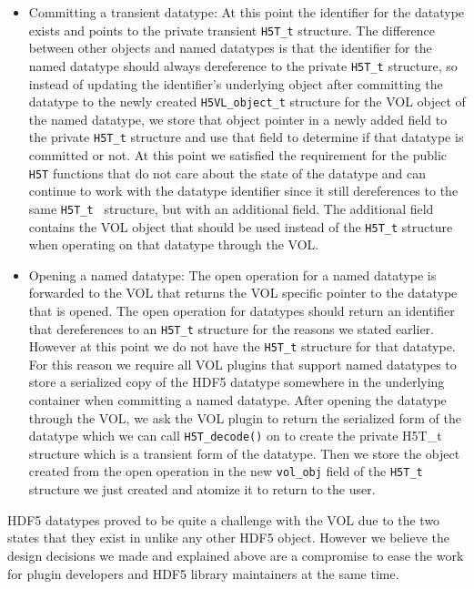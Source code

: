 \begin{itemize}
\item Committing a transient datatype: At this point the identifier for the datatype exists and points to the private transient {\tt H5T\_t} structure. The difference between other objects and named datatypes is that the identifier for the named datatype should always dereference to the private {\tt H5T\_t} structure, so instead of updating the identifier's underlying object after committing the datatype to the newly created {\tt H5VL\_object\_t} structure for the VOL object of the named datatype, we store that object pointer in a newly added field to the private {\tt H5T\_t} structure and use that field to determine if that datatype is committed or not. At this point we satisfied the requirement for the public {\tt H5T} functions that do not care about the state of the datatype and can continue to work with the datatype identifier since it still dereferences to the same {\tt H5T\_t } structure, but with an additional field. The additional field contains the VOL object that should be used instead of the {\tt H5T\_t} structure when operating on that datatype through the VOL.

\item Opening a named datatype: The open operation for a named datatype is forwarded to the VOL that returns the VOL specific pointer to the datatype that is opened. The open operation for datatypes should return an identifier that dereferences to an {\tt H5T\_t} structure for the reasons we stated earlier. However at this point we do not have the {\tt H5T\_t} structure for that datatype. For this reason we require all VOL plugins that support named datatypes to store a serialized copy of the HDF5 datatype somewhere in the underlying container when committing a named datatype. After opening the datatype through the VOL, we ask the VOL plugin to return the serialized form of the datatype which we can call {\tt H5T\_decode()} on to create the private {H5T\_t} structure which is a transient form of the datatype. Then we store the object created from the open operation in the new {\tt vol\_obj} field of the {\tt H5T\_t} structure we just created and atomize it to return to the user.
\end{itemize}

HDF5 datatypes proved to be quite a challenge with the VOL due to the two states that they exist in unlike any other HDF5 object. However we believe the design decisions we made and explained above are a compromise to ease the work for plugin developers and HDF5 library maintainers at the same time.


